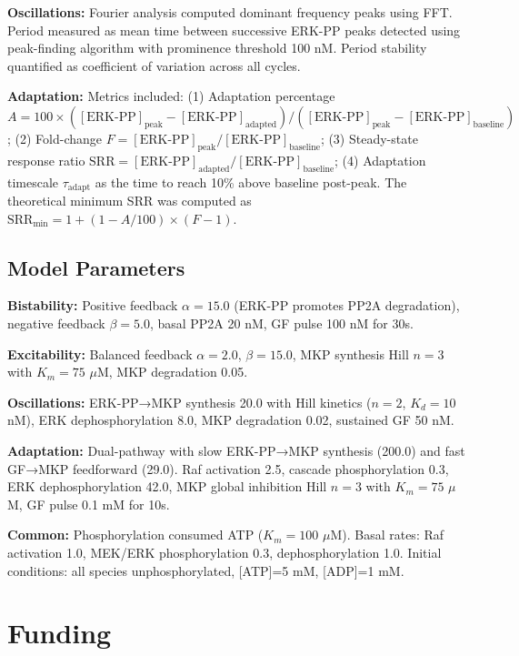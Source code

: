 \documentclass[twocolumn,11pt]{article}
\begin{document}
\textbf{Oscillations:} Fourier analysis computed dominant frequency peaks using FFT. Period measured as mean time between successive ERK-PP peaks detected using peak-finding algorithm with prominence threshold 100 nM. Period stability quantified as coefficient of variation across all cycles.

\textbf{Adaptation:} Metrics included: (1) Adaptation percentage $A = 100 \times ([\text{ERK-PP}]_{\text{peak}} - [\text{ERK-PP}]_{\text{adapted}}) / ([\text{ERK-PP}]_{\text{peak}} - [\text{ERK-PP}]_{\text{baseline}})$; (2) Fold-change $F = [\text{ERK-PP}]_{\text{peak}} / [\text{ERK-PP}]_{\text{baseline}}$; (3) Steady-state response ratio $\text{SRR} = [\text{ERK-PP}]_{\text{adapted}} / [\text{ERK-PP}]_{\text{baseline}}$; (4) Adaptation timescale $\tau_{\text{adapt}}$ as the time to reach 10\% above baseline post-peak. The theoretical minimum SRR was computed as $\text{SRR}_{\text{min}} = 1 + (1 - A/100) \times (F - 1)$.

\subsection*{Model Parameters}

\textbf{Bistability:} Positive feedback $\alpha = 15.0$ (ERK-PP promotes PP2A degradation), negative feedback $\beta = 5.0$, basal PP2A 20 nM, GF pulse 100 nM for 30s.

\textbf{Excitability:} Balanced feedback $\alpha = 2.0$, $\beta = 15.0$, MKP synthesis Hill $n=3$ with $K_m = 75$ $\mu$M, MKP degradation 0.05.

\textbf{Oscillations:} ERK-PP→MKP synthesis 20.0 with Hill kinetics ($n=2$, $K_d=10$ nM), ERK dephosphorylation 8.0, MKP degradation 0.02, sustained GF 50 nM.

\textbf{Adaptation:} Dual-pathway with slow ERK-PP→MKP synthesis (200.0) and fast GF→MKP feedforward (29.0). Raf activation 2.5, cascade phosphorylation 0.3, ERK dephosphorylation 42.0, MKP global inhibition Hill $n=3$ with $K_m=75$ $\mu$M, GF pulse 0.1 mM for 10s.

\textbf{Common:} Phosphorylation consumed ATP ($K_m = 100$ $\mu$M). Basal rates: Raf activation 1.0, MEK/ERK phosphorylation 0.3, dephosphorylation 1.0. Initial conditions: all species unphosphorylated, [ATP]=5 mM, [ADP]=1 mM.

\section*{Funding}
\end{document}
